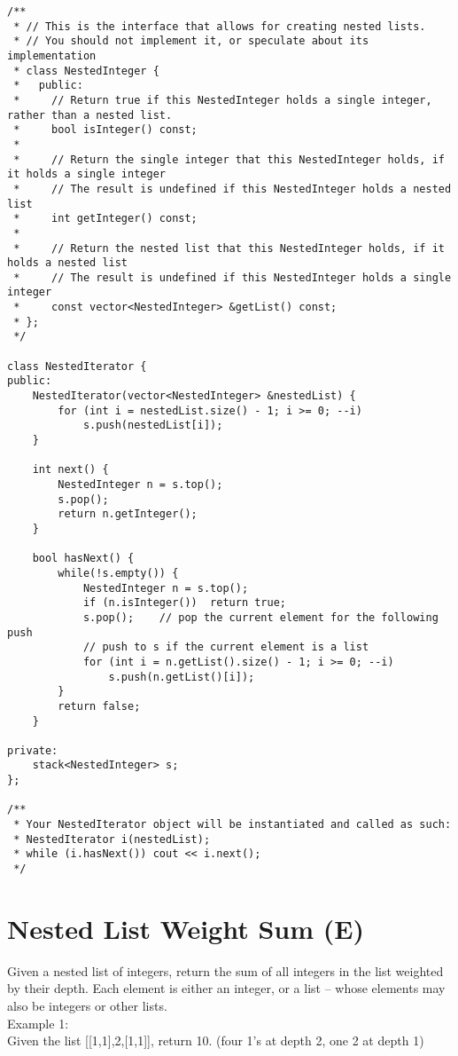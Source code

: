\begin{lstlisting}
/**
 * // This is the interface that allows for creating nested lists.
 * // You should not implement it, or speculate about its implementation
 * class NestedInteger {
 *   public:
 *     // Return true if this NestedInteger holds a single integer, rather than a nested list.
 *     bool isInteger() const;
 *
 *     // Return the single integer that this NestedInteger holds, if it holds a single integer
 *     // The result is undefined if this NestedInteger holds a nested list
 *     int getInteger() const;
 *
 *     // Return the nested list that this NestedInteger holds, if it holds a nested list
 *     // The result is undefined if this NestedInteger holds a single integer
 *     const vector<NestedInteger> &getList() const;
 * };
 */
 
class NestedIterator {
public:
    NestedIterator(vector<NestedInteger> &nestedList) {
        for (int i = nestedList.size() - 1; i >= 0; --i)
            s.push(nestedList[i]);
    }

    int next() {
        NestedInteger n = s.top();
        s.pop();
        return n.getInteger();
    }

    bool hasNext() {
        while(!s.empty()) {
            NestedInteger n = s.top();
            if (n.isInteger())  return true;
            s.pop();    // pop the current element for the following push
            // push to s if the current element is a list
            for (int i = n.getList().size() - 1; i >= 0; --i)   
                s.push(n.getList()[i]);
        }
        return false;
    }
    
private:
    stack<NestedInteger> s;
};

/**
 * Your NestedIterator object will be instantiated and called as such:
 * NestedIterator i(nestedList);
 * while (i.hasNext()) cout << i.next();
 */
\end{lstlisting}


\section{Nested List Weight Sum (E)}
Given a nested list of integers, return the sum of all integers in the list weighted by their depth. Each element is either an integer, or a list -- whose elements may also be integers or other lists. \\

Example 1:\\
Given the list [[1,1],2,[1,1]], return 10. (four 1's at depth 2, one 2 at depth 1)\\

